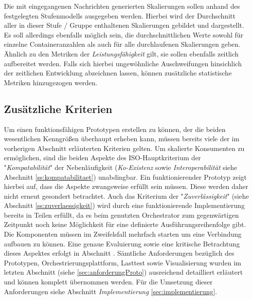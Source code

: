 
Die mit eingegangenen Nachrichten generierten Skalierungen sollen anhand des festgelegten Stufenmodells ausgegeben werden. Hierbei wird der Durchschnitt aller in dieser Stufe / Gruppe enthaltenen Skalierungen gebildet und dargestellt. Es soll allerdings ebenfalls möglich sein, die durchschnittlichen Werte sowohl für einzelne Containeranzahlen als auch für alle durchlaufenen Skalierungen geben. Ähnlich zu den Metriken der \emph{Leistungsfähigkeit} gilt, sie sollen ebenfalls zeitlich aufbereitet werden. Falls sich hierbei ungewöhnliche Auschweifungen hinsichlich der zeitlichen Entwicklung abzeichnen lassen, können zusätzliche statistische Metriken hinzugezogen werden. 


\subsection{Zusätzliche Kriterien \checkmark}
Um einen funktionsfähigen Prototypen erstellen zu können, der die beiden wesentlichen Kenngrößen überhaupt erheben kann, müssen bereits viele der im vorherigen Abschnitt erläuterten Kriterien gelten. Um skalierte Konsumenten zu ermöglichen, sind die beiden Aspekte des ISO-Hauptkriterium der "\emph{Kompatabilität}" der Nebenläufigkeit (\emph{Ko-Existenz} sowie \emph{Interoperabilität} siehe Abschnitt \ref{ss:kompatabilitaet}) unabdingbar. Ein funktionierender Prototyp zeigt hierbei auf, dass die Aspekte zwangsweise erfüllt sein müssen. Diese werden daher nicht erneut gesondert betrachtet. Auch das Kriterium der "\emph{Zuverlässigkeit}" (siehe Abschnitt \ref{ss:zuverlaessigkeit}) wird durch eine funktionierende Implementierung bereits in Teilen erfüllt, da es beim genutzten Orchestrator zum gegenwärtigen Zeitpunkt noch keine Möglichkeit für eine definierte Ausführungsreihenfolge gibt. Die Komponenten müssen im Zweifelsfall mehrfach starten um eine Verbindung aufbauen zu können. Eine genaue Evaluierung sowie eine kritische Betrachtung dieses Aspektes erfolgt in Abschnitt . Sämtliche Anforderungen bezüglich des Prototypen, Orchestrierungsplattform, Lasttest sowie Visualisierung wurden im letzten Abschnitt (siehe \ref{sec:anforderungProto}) ausreichend detailliert erläutert und können komplett übernommen werden. Für die Umsetzung dieser Anforderungen siehe Abschnitt \emph{Implementierung} \ref{sec:implementierung}.

